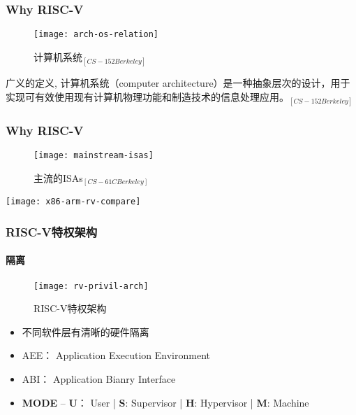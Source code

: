 
\begin{frame}
	
	\frametitle{Why RISC-V}
	
	\begin{figure}
		\centering
		\texttt{[image: arch-os-relation]}
		\caption{计算机系统$_{[CS-152 Berkeley]}$}
	\end{figure}
	
	广义的定义, 计算机系统（computer architecture）是一种抽象层次的设计，用于实现可有效使用现有计算机物理功能和制造技术的信息处理应用。$_{[CS-152 Berkeley]}$
\end{frame}


\begin{frame}
	
	\frametitle{Why RISC-V}
	
	\begin{figure}
		\centering
		\texttt{[image: mainstream-isas]}
		\caption{主流的ISAs$ _{[CS-61C Berkeley]} $}
	\end{figure}
	
		\centering
		\texttt{[image: x86-arm-rv-compare]}
	
	
	
	
\end{frame}


\begin{frame}
	\frametitle{RISC-V特权架构}
	\framesubtitle{隔离}
	
	\begin{figure}
	\centering
	\texttt{[image: rv-privil-arch]}
	\caption{RISC-V特权架构}
	\end{figure}

\begin{itemize}
	
	\item 不同软件层有清晰的硬件隔离
	\item AEE： Application Execution Environment
	\item ABI： Application Bianry Interface
	\item \textbf{MODE} -- \textbf{U}： User | \textbf{S}: Supervisor | \textbf{H}: Hypervisor | \textbf{M}: Machine

\end{itemize}

\end{frame}

